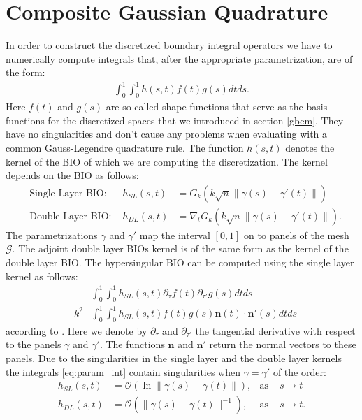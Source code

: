 \documentclass[a4paper, oneside]{thirdparty_stylesheets/discothesis}
\begin{document}
\section{Composite Gaussian Quadrature} \label{cg}
In order to construct the discretized boundary integral operators we have to numerically compute integrals that, after the appropriate parametrization, are of the form:
\begin{align}
	\int_{0}^{1}\int_{0}^{1} h(s,t)f(t)g(s)dtds. \label{eq:param_int}
\end{align}
Here $f(t)$ and $g(s)$ are so called shape functions that serve as the basis functions for the discretized spaces that we introduced in section \ref{gbem}.
They have no singularities and don't cause any problems when evaluating with a common Gauss-Legendre quadrature rule.
The function $h(s,t)$ denotes the kernel of the BIO of which we are computing the discretization. 
The kernel depends on the BIO as follows:
\begin{align}
	&\text{Single Layer BIO: } &h_{SL}(s,t) &= G_k(k\sqrt{n}\|\gamma(s)-\gamma'(t)\|) \\
	&\text{Double Layer BIO: } &h_{DL}(s,t) &= \nabla_tG_k(k\sqrt{n}\|\gamma(s)-\gamma'(t)\|).
\end{align}
The parametrizations $\gamma$ and $\gamma'$ map the interval $[0,1]$ on to panels of the mesh $\mathcal{G}$.
The adjoint double layer BIOs kernel is of the same form as the kernel of the double layer BIO.
The hypersingular BIO can be computed using the single layer kernel as follows:
\begin{align}
	&\int_{0}^{1}\int_{0}^{1} h_{SL}(s,t) \partial_{\tau} f(t) \partial_{\tau'}  g(s)dtds\\
	-k^2&\int_{0}^{1}\int_{0}^{1} h_{SL}(s,t)f(t)g(s)\mathbf{n}(t)\cdot\mathbf{n'}(s)dtds
\end{align}
according to \cite{McLean2002StronglyES}. 
Here we denote by $\partial_{\tau}$ and $\partial_{\tau'}$ the tangential derivative with respect to the panels $\gamma$ and $\gamma'$.
The functions $\mathbf{n}$ and $\mathbf{n'}$ return the normal vectors to these panels.
Due to the singularities in the single layer and the double layer kernels the integrals \ref{eq:param_int} contain singularities when $\gamma=\gamma'$ of the order:
\begin{align}
	h_{SL}(s,t) &=	\mathcal{O}(\ln\|\gamma(s)-\gamma(t)\|), &\text{as } &s \rightarrow t\\
	h_{DL}(s,t) &= \mathcal{O}(\|\gamma(s)-\gamma(t)\|^{-1}), &\text{as } &s \rightarrow t.
\end{align}
\end{document}
